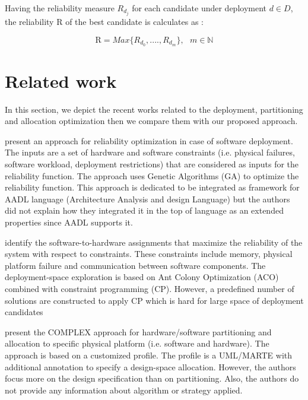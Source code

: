 \documentclass[3p,times,procedia,authoryear,round]{elsarticle}
\begin{document}
Having the reliability measure $R_{d_{j}}$ for each candidate under deployment $d \in D$, the reliability $\mathrm{R}$ of the best candidate is calculates as :

\begin{equation}
\label{eq3}
\mathrm{R}=  Max \{ R_{d_{0}} , . . . . , R_{d_{m}} \}, \ \ \   m \in \mathbb{N}
\end{equation}



\section{Related work}
\label{Related works}

In this section, we depict the recent works related to the deployment, partitioning and allocation optimization then we compare them with our proposed approach.


\cite{Meedeniya2011835} present an approach for reliability optimization in case of software deployment. The inputs are a set of hardware and software constraints (i.e. physical failures, software workload, deployment restrictions) that are considered as inputs for the reliability function. The approach uses Genetic Algorithms (GA) \citep{Sivanandam2010} to optimize the reliability function. This approach is dedicated to be integrated as framework for AADL language (Architecture Analysis and design Language) \citep{5446809} but the authors did not explain how they integrated it in the top of language as an extended properties since AADL supports it.

\cite{Thiruvady20141937} identify the software-to-hardware assignments that maximize the reliability of the system with respect to constraints. These constraints include memory, physical platform failure and communication between software components. The deployment-space exploration is based on Ant Colony Optimization (ACO) combined with constraint programming (CP). However, a predefined number of solutions are constructed to apply CP which is hard for large space of deployment candidates

\cite{Herrera201455} present the COMPLEX approach for hardware/software partitioning and allocation to specific physical platform (i.e. software and hardware). The approach is based on a customized profile. The profile is a UML/MARTE with additional annotation to specify a design-space allocation. However, the authors focus more on the design specification than on partitioning. Also, the authors do not provide any information about algorithm or strategy applied.
\end{document}
